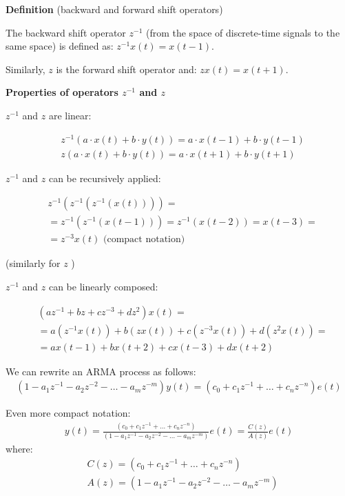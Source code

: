 \documentclass[10pt,a4paper,twoside,openright]{book}
\begin{document}
\textbf{Definition} (backward and forward shift operators)

The backward shift operator $z^{-1}$ (from the space of discrete-time signals to the same space) is defined as: $z^{-1} x(t)=x(t-1)$.

Similarly, $z$ is the forward shift operator and: $z x(t)=x(t+1)$.

\textbf{Properties of operators $z^{-1}$ and $z$}

$z^{-1}$ and $z$ are linear:

\begin{align*}
	&z^{-1}(a \cdot x(t)+b \cdot y(t))=a \cdot x(t-1)+b \cdot y(t-1) \\
	&z(a \cdot x(t)+b \cdot y(t))=a \cdot x(t+1)+b \cdot y(t+1)
\end{align*}

$z^{-1}$ and $z$ can be recursively applied:

\begin{align*}
	&z^{-1}\left(z^{-1}\left(z^{-1}(x(t))\right)\right)= \\
	&=z^{-1}\left(z^{-1}(x(t-1))\right)=z^{-1}(x(t-2))=x(t-3)= \\
	&=z^{-3} x(t) \text { (compact notation) }
\end{align*}

(similarly for $z$ )

$z^{-1}$ and $z$ can be linearly composed:

\begin{align*}
	&\left(a z^{-1}+b z+c z^{-3}+d z^{2}\right) x(t)= \\
	&=a\left(z^{-1} x(t)\right)+b(z x(t))+c\left(z^{-3} x(t)\right)+d\left(z^{2} x(t)\right)= \\
	&=a x(t-1)+b x(t+2)+c x(t-3)+d x(t+2)
\end{align*}

We can rewrite an ARMA process as follows:
\begin{align*}
	\left(1-a_{1} z^{-1}-a_{2} z^{-2}-\ldots-a_{m} z^{-m}\right) y(t)=\left(c_{0}+c_{1} z^{-1}+\ldots+c_{n} z^{-n}\right) e(t)
\end{align*}

Even more compact notation:
\begin{align*}
	y(t)=\frac{\left(c_{0}+c_{1} z^{-1}+\ldots+c_{n} z^{-n}\right)}{\left(1-a_{1} z^{-1}-a_{2} z^{-2}-\ldots-a_{m} z^{-m}\right)} e(t)=\frac{C(z)}{A(z)} e(t)
\end{align*}
where:
\begin{align*}
	&C(z)=\left(c_{0}+c_{1} z^{-1}+\ldots+c_{n} z^{-n}\right) \\
	&A(z)=\left(1-a_{1} z^{-1}-a_{2} z^{-2}-\ldots-a_{m} z^{-m}\right)
\end{align*}
\end{document}
